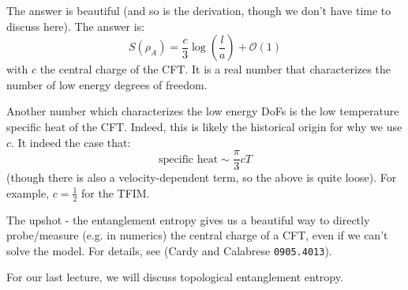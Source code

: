 The answer is beautiful (and so is the derivation, though we don't have time to discuss here). The answer is:
\begin{equation}
    S(\rho_A) = \frac{c}{3}\log(\frac{l}{a}) + \mathcal{O}(1)
\end{equation}
with $c$ the central charge of the CFT. It is a real number that characterizes the number of low energy degrees of freedom.

Another number which characterizes the low energy DoFs is the low temperature specific heat of the CFT. Indeed, this is likely the historical origin for why we use $c$. It indeed the case that:
\begin{equation}
    \text{specific heat} \sim \frac{\pi}{3}cT
\end{equation}
(though there is also a velocity-dependent term, so the above is quite loose). For example, $c = \frac{1}{2}$ for the TFIM. 

The upshot - the entanglement entropy gives us a beautiful way to directly probe/measure (e.g. in numerics) the central charge of a CFT, even if we can't solve the model. For details, see (Cardy and Calabrese \texttt{0905.4013}). 

For our last lecture, we will discuss topological entanglement entropy.